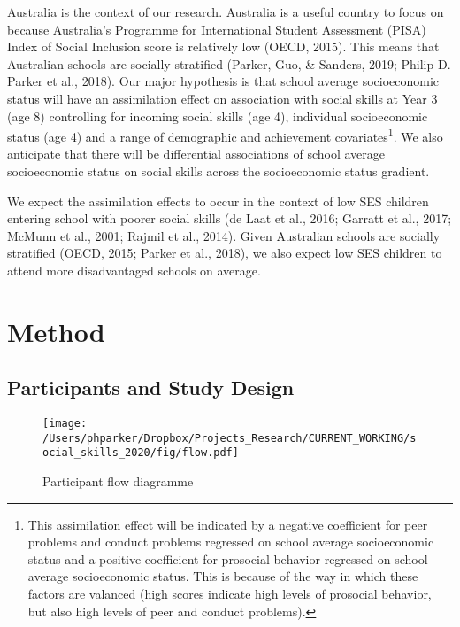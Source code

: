 \documentclass[
  english,
  man]{apa6}
\begin{document}
Australia is the context of our research. Australia is a useful country to focus on because Australia's Programme for International Student Assessment (PISA) Index of Social Inclusion score is relatively low (OECD, 2015). This means that Australian schools are socially stratified (Parker, Guo, \& Sanders, 2019; Philip D. Parker et al., 2018). Our major hypothesis is that school average socioeconomic status will have an assimilation effect on association with social skills at Year 3 (age 8) controlling for incoming social skills (age 4), individual socioeconomic status (age 4) and a range of demographic and achievement covariates\footnote{This assimilation effect will be indicated by a negative coefficient for peer problems and conduct problems regressed on school average socioeconomic status and a positive coefficient for prosocial behavior regressed on school average socioeconomic status. This is because of the way in which these factors are valanced (high scores indicate high levels of prosocial behavior, but also high levels of peer and conduct problems).}. We also anticipate that there will be differential associations of school average socioeconomic status on social skills across the socioeconomic status gradient.

We expect the assimilation effects to occur in the context of low SES children entering school with poorer social skills (de Laat et al., 2016; Garratt et al., 2017; McMunn et al., 2001; Rajmil et al., 2014). Given Australian schools are socially stratified (OECD, 2015; Parker et al., 2018), we also expect low SES children to attend more disadvantaged schools on average.

\hypertarget{method}{%
\section{Method}\label{method}}

\hypertarget{participants-and-study-design}{%
\subsection{Participants and Study Design}\label{participants-and-study-design}}

\begin{figure}
\centering
\texttt{[image: /Users/phparker/Dropbox/Projects\_Research/CURRENT\_WORKING/social\_skills\_2020/fig/flow.pdf]}
\caption{\label{fig:consort}Participant flow diagramme}
\end{figure}
\end{document}
